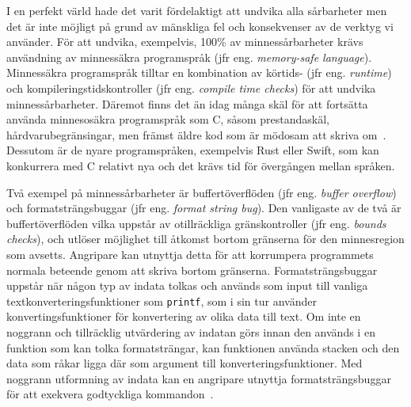 I en perfekt värld hade det varit fördelaktigt att undvika alla sårbarheter men
det är inte möjligt på grund av mänskliga fel och konsekvenser av de verktyg vi
använder. För att undvika, exempelvis, 100\% av minnessårbarheter krävs
användning av minnessäkra programspråk (jfr eng. \emph{memory-safe language}).
Minnessäkra programspråk tilltar en kombination av körtids- (jfr eng.
\emph{runtime}) och kompileringstidskontroller (jfr eng. \emph{compile
    time checks}) för att undvika minnessårbarheter. Däremot finns det än idag
många skäl för att fortsätta använda minnesosäkra programspråk som C, såsom
prestandaskäl, hårdvarubegränsingar, men främst äldre kod som är mödosam att
skriva om~\cite{computer_security_cs161}. Dessutom är de nyare programspråken,
exempelvis Rust eller Swift, som kan konkurrera med C relativt nya och det
krävs tid för övergången mellan språken.

Två exempel på minnessårbarheter är buffertöverflöden (jfr eng. \emph{buffer
    overflow}) och formatsträngsbuggar (jfr eng. \emph{format string bug}). Den
vanligaste av de två är buffertöverflöden vilka uppstår av otillräckliga
gränskontroller (jfr eng. \emph{bounds checks}), och utlöser möjlighet till åtkomst bortom 
gränserna för den minnesregion som avsetts. Angripare kan utnyttja detta för att korrumpera programmets
normala beteende genom att skriva bortom gränserna. Formatsträngsbuggar uppstår
när någon typ av indata tolkas och används som input till vanliga
textkonverteringsfunktioner som \texttt{printf}, som i sin tur använder
konvertingsfunktioner för konvertering av olika data till text. Om inte en
noggrann och tillräcklig utvärdering av indatan görs innan den används i en
funktion som kan tolka formatsträngar, kan funktionen använda stacken och den
data som råkar ligga där som argument till konverteringsfunktioner. Med noggrann
utformning av indata kan en angripare utnyttja formatsträngsbuggar för att
exekvera godtyckliga kommandon~\cite{computer_security_cs161}.




